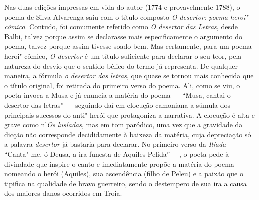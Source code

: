 Nas duas edições impressas em vida do autor (1774 e provavelmente 1788), o poema
de Silva Alvarenga saiu com o título composto \textit{O desertor: poema
heroi"-cômico}. Contudo, foi comumente referido como \textit{O desertor das
Letras}, desde Balbi, talvez porque assim se declarasse mais especificamente o
argumento do poema, talvez porque assim tivesse soado bem. Mas certamente, para
um poema heroi"-cômico, \textit{O desertor} é um título suficiente para declarar o
seu teor, pela natureza do desvio que o sentido bélico do termo já representa.
De qualquer maneira, a fórmula \textit{o desertor das letras}, que quase se
tornou mais conhecida que o título original, foi retirada do primeiro verso do
poema. Ali, como se viu, o poeta invoca a Musa e já enuncia a matéria do poema
--- ``Musa, cantai o desertor das letras'' --- seguindo daí em elocução camoniana
a súmula dos principais sucessos do anti"-herói que protagoniza a narrativa.  A
elocução é alta e grave como n'\textit{Os lusíadas}, mas em tom paródico, uma
vez que a gravidade da dicção não corresponde decididamente à baixeza da
matéria, cuja depreciação só a palavra \textit{desertor} já bastaria para
declarar. No primeiro verso da \textit{Ilíada} --- ``Canta"-me, ó Deusa, a ira
funesta de Aquiles Pelida'' ---, o poeta pede à divindade que inspire o canto e
imediatamente propõe a matéria do poema nomeando o herói (Aquiles), sua
ascendência (filho de Peleu) e a paixão que o tipifica na qualidade de bravo
guerreiro, sendo o destempero de sua ira a causa dos maiores danos ocorridos em
Troia.

